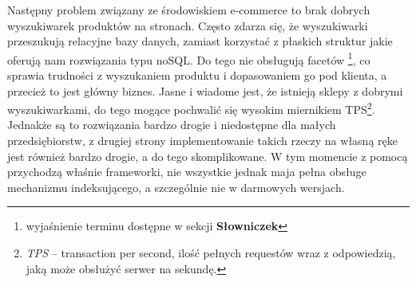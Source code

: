 Następny problem związany ze środowiskiem e-commerce to brak dobrych wyszukiwarek produktów na stronach. Często zdarza się, że wyszukiwarki przeszukują relacyjne bazy danych, zamiast korzystać z płaskich struktur jakie oferują nam rozwiązania typu noSQL. Do tego nie obsługują facetów \footnote{wyjaśnienie terminu dostępne w sekcji \textbf{Słowniczek}}, co sprawia trudności z wyszukaniem produktu i dopasowaniem go pod klienta, a przecież to jest główny biznes. Jasne i wiadome jest, że istnieją sklepy z dobrymi wyszukiwarkami, do tego mogące pochwalić się wysokim miernikiem TPS\footnote{\textit{TPS} -- transaction per second, ilość pełnych requestów wraz z odpowiedzią, jaką może obsłużyć serwer na sekundę.}. Jednakże są to rozwiązania bardzo drogie i niedostępne dla małych przedsiębiorstw, z drugiej strony implementowanie takich rzeczy na własną ręke jest również bardzo drogie, a do tego skomplikowane. W tym momencie z pomocą przychodzą właśnie frameworki, nie wszystkie jednak maja pełna obsługe mechanizmu indeksującego, a szczególnie nie w darmowych wersjach.



